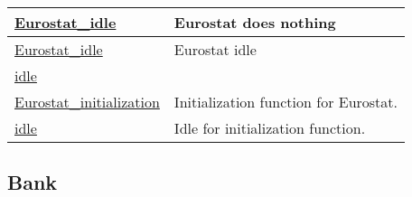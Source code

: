 \documentclass[a4paper,11pt]{article}
\begin{document}
\begin{landscape}
\begin{longtable}[H!]{ll}
\midrule
\url{Eurostat_idle} \index{\url{Eurostat_idle}} & \parbox{10cm}{Eurostat does nothing} \\
\midrule
\url{Eurostat_idle}  & \parbox{10cm}{Eurostat idle} \\
\midrule
\url{idle}  & \parbox{10cm}{} \\
\midrule
\url{Eurostat_initialization}  & \parbox{10cm}{Initialization function for Eurostat.} \\
\midrule
\url{idle}  & \parbox{10cm}{Idle for initialization function.} \\
\end{longtable}
\end{landscape}



\clearpage
\subsection{Bank}
\end{document}
